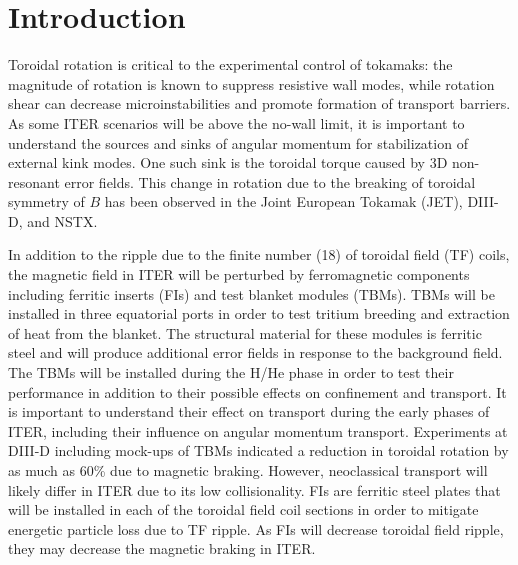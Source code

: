 \documentclass[aip, pop, preprint]{revtex4-1}
\numberwithin{figure}{section}
\numberwithin{equation}{section}
\begin{document}
\section{Introduction}

Toroidal rotation is critical to the experimental control of tokamaks: the magnitude of rotation is known to suppress resistive wall modes,\cite{Bondeson1994, Garofalo2002} while rotation shear can decrease microinstabilities and promote formation of transport barriers.\cite{Burrell1997, Terry2000} As some ITER scenarios will be above the no-wall limit,\cite{Liu2004} it is important to understand the sources and sinks of angular momentum for stabilization of external kink modes. One such sink is the toroidal torque caused by 3D non-resonant error fields. This change in rotation due to the breaking of toroidal symmetry of $B$ has been observed in the Joint European Tokamak (JET),\cite{Lazzaro2002, DeVries2008} DIII-D,\cite{Garofalo2008} and NSTX.\cite{Zhu2006} 

In addition to the ripple due to the finite number (18) of toroidal field (TF) coils, the magnetic field in ITER will be perturbed by ferromagnetic components including ferritic inserts (FIs) and test blanket modules (TBMs). TBMs will be installed in three equatorial ports in order to test tritium breeding and extraction of heat from the blanket. The structural material for these modules is ferritic steel and will produce additional error fields in response to the background field. The TBMs will be installed during the H/He phase in order to test their performance in addition to their possible effects on confinement and transport.\cite{Chuyanov2010} It is important to understand their effect on transport during the early phases of ITER, including their influence on angular momentum transport. Experiments at DIII-D including mock-ups of TBMs indicated a reduction in toroidal rotation by as much as 60\% due to magnetic braking.\cite{Schaffer2011} However, neoclassical transport will likely differ in ITER due to its low collisionality. FIs are ferritic steel plates that will be installed in each of the toroidal field coil sections in order to mitigate energetic particle loss due to TF ripple.\cite{Tobita2003} As FIs will decrease toroidal field ripple, they may decrease the magnetic braking in ITER. 
\end{document}
